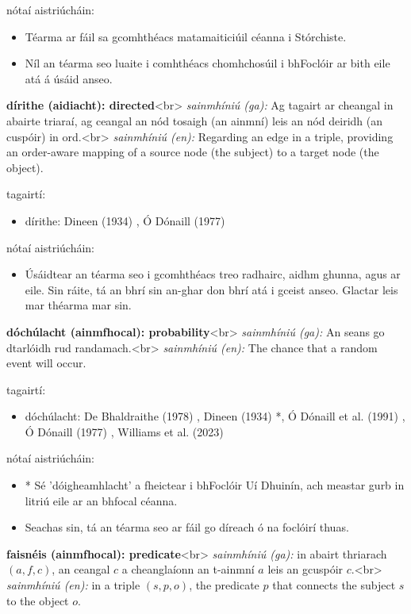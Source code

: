 \documentclass{article}
\begin{document}
nótaí aistriúcháin:
\begin{itemize}
	\item Téarma ar fáil sa gcomhthéacs matamaiticiúil céanna i Stórchiste.
	\item Níl an téarma seo luaite i comhthéacs chomhchosúil i bhFoclóir ar bith eile atá á úsáid anseo.
\end{itemize}


\textbf{dírithe (aidiacht): directed}<br>
\textit{sainmhíniú (ga):} Ag tagairt ar cheangal in abairte triaraí, ag ceangal an nód tosaigh (an ainmní) leis an nód deiridh (an cuspóir) in ord.<br>
\textit{sainmhíniú (en):} Regarding an edge in a triple, providing an order-aware mapping of a source node (the subject) to a target node (the object).

tagairtí:
\begin{itemize}
	\item dírithe: Dineen (1934) \cite{dineen}, Ó Dónaill (1977) \cite{odonaill}
\end{itemize}

nótaí aistriúcháin:
\begin{itemize}
	\item Úsáidtear an téarma seo i gcomhthéacs treo radhairc, aidhm ghunna, agus ar eile. Sin ráite, tá an bhrí sin an-ghar don bhrí atá i gceist anseo. Glactar leis mar théarma mar sin.
\end{itemize}


\textbf{dóchúlacht (ainmfhocal): probability}<br>
\textit{sainmhíniú (ga):} An seans go dtarlóidh rud randamach.<br>
\textit{sainmhíniú (en):} The chance that a random event will occur.

tagairtí:
\begin{itemize}
	\item dóchúlacht: De Bhaldraithe (1978) \cite{de-bhaldraithe}, Dineen (1934) \cite{dineen}*, Ó Dónaill et al. (1991) \cite{focloir-beag}, Ó Dónaill (1977) \cite{odonaill}, Williams et al. (2023) \cite{storchiste}
\end{itemize}

nótaí aistriúcháin:
\begin{itemize}
	\item * Sé 'dóigheamhlacht' a fheictear i bhFoclóir Uí Dhuinín, ach meastar gurb in litriú eile ar an bhfocal céanna.
	\item Seachas sin, tá an téarma seo ar fáil go díreach ó na foclóirí thuas.
\end{itemize}


\textbf{faisnéis (ainmfhocal): predicate}<br>
\textit{sainmhíniú (ga):} in abairt thriarach $(a,f,c)$, an ceangal $c$ a cheanglaíonn an t-ainmní $a$ leis an gcuspóir $c$.<br>
\textit{sainmhíniú (en):} in a triple $(s,p,o)$, the predicate $p$ that connects the subject $s$ to the object $o$.
\end{document}
